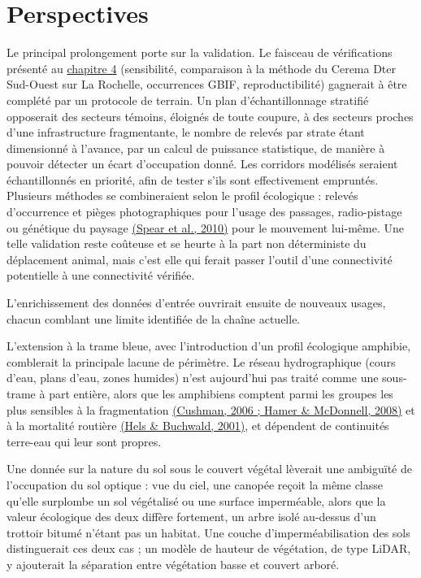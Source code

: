 \documentclass[a4paper,11pt]{report}
\begin{document}
\section{Perspectives}\label{sec:5.2}

Le principal prolongement porte sur la validation. Le faisceau de vérifications présenté au \hyperref[chap:4]{chapitre 4} (sensibilité, comparaison à la méthode du Cerema Dter Sud-Ouest sur La Rochelle, occurrences GBIF, reproductibilité) gagnerait à être complété par un protocole de terrain. Un plan d'échantillonnage stratifié opposerait des secteurs témoins, éloignés de toute coupure, à des secteurs proches d'une infrastructure fragmentante, le nombre de relevés par strate étant dimensionné à l'avance, par un calcul de puissance statistique, de manière à pouvoir détecter un écart d'occupation donné. Les corridors modélisés seraient échantillonnés en priorité, afin de tester s'ils sont effectivement empruntés. Plusieurs méthodes se combineraient selon le profil écologique : relevés d'occurrence et pièges photographiques pour l'usage des passages, radio-pistage ou génétique du paysage \hyperref[sec:bibliographie]{(Spear et al., 2010)} pour le mouvement lui-même. Une telle validation reste coûteuse et se heurte à la part non déterministe du déplacement animal, mais c'est elle qui ferait passer l'outil d'une connectivité potentielle à une connectivité vérifiée.

L'enrichissement des données d'entrée ouvrirait ensuite de nouveaux usages, chacun comblant une limite identifiée de la chaîne actuelle.

L'extension à la trame bleue, avec l'introduction d'un profil écologique amphibie, comblerait la principale lacune de périmètre. Le réseau hydrographique (cours d'eau, plans d'eau, zones humides) n'est aujourd'hui pas traité comme une sous-trame à part entière, alors que les amphibiens comptent parmi les groupes les plus sensibles à la fragmentation \hyperref[sec:bibliographie]{(Cushman, 2006 ; Hamer \& McDonnell, 2008)} et à la mortalité routière \hyperref[sec:bibliographie]{(Hels \& Buchwald, 2001)}, et dépendent de continuités terre-eau qui leur sont propres.

Une donnée sur la nature du sol sous le couvert végétal lèverait une ambiguïté de l'occupation du sol optique : vue du ciel, une canopée reçoit la même classe qu'elle surplombe un sol végétalisé ou une surface imperméable, alors que la valeur écologique des deux diffère fortement, un arbre isolé au-dessus d'un trottoir bitumé n'étant pas un habitat. Une couche d'imperméabilisation des sols distinguerait ces deux cas ; un modèle de hauteur de végétation, de type LiDAR, y ajouterait la séparation entre végétation basse et couvert arboré.
\end{document}
